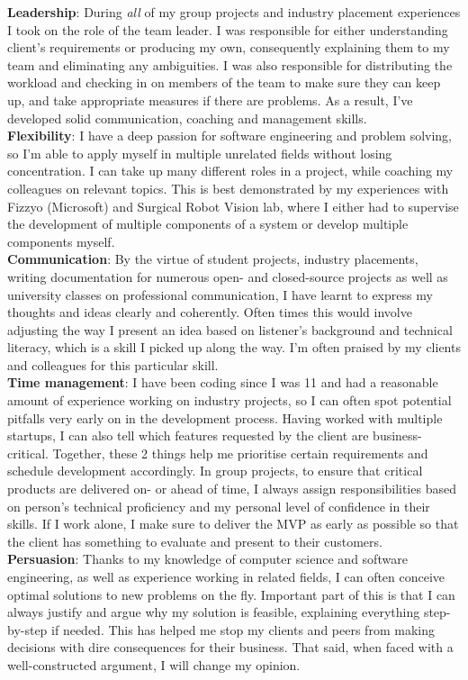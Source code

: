 \documentclass{article}
\begin{document}
\begin{multicols}{2}
\textbf{Leadership}: During \textit{all} of my group projects and industry placement experiences I took on the role of the team leader. I was responsible for either understanding client's requirements or producing my own, consequently explaining them to my team and eliminating any ambiguities. I was also responsible for distributing the workload and checking in on members of the team to make sure they can keep up, and take appropriate measures if there are problems. As a result, I've developed solid communication, coaching and management skills.
\vspace{2mm} \\
\textbf{Flexibility}: I have a deep passion for software engineering and problem solving, so I'm able to apply myself in multiple unrelated fields without losing concentration. I can take up many different roles in a project, while coaching my colleagues on relevant topics. This is best demonstrated by my experiences with Fizzyo (Microsoft) and Surgical Robot Vision lab, where I either had to supervise the development of multiple components of a system or develop multiple components myself.
\vspace{2mm} \\
\textbf{Communication}: By the virtue of student projects, industry placements, writing documentation for numerous open- and closed-source projects as well as university classes on professional communication, I have learnt to express my thoughts and ideas clearly and coherently. Often times this would involve adjusting the way I present an idea based on listener's background and technical literacy, which is a skill I picked up along the way. I'm often praised by my clients and colleagues for this particular skill.
\vspace{2mm} \\
\textbf{Time management}: I have been coding since I was 11 and had a reasonable amount of experience working on industry projects, so I can often spot potential pitfalls very early on in the development process. Having worked with multiple startups, I can also tell which features requested by the client are business-critical. Together, these 2 things help me prioritise certain requirements and schedule development accordingly. In group projects, to ensure that critical products are delivered on- or ahead of time, I always assign responsibilities based on person's technical proficiency and my personal level of confidence in their skills. If I work alone, I make sure to deliver the MVP as early as possible so that the client has something to evaluate and present to their customers.  
\vspace{2mm} \\
\textbf{Persuasion}: Thanks to my knowledge of computer science and software engineering, as well as experience working in related fields, I can often conceive optimal solutions to new problems on the fly. Important part of this is that I can always justify and argue why my solution is feasible, explaining everything step-by-step if needed. This has helped me stop my clients and peers from making decisions with dire consequences for their business. That said, when faced with a well-constructed argument, I will change my opinion.
\vfill

\end{multicols}
\end{document}
